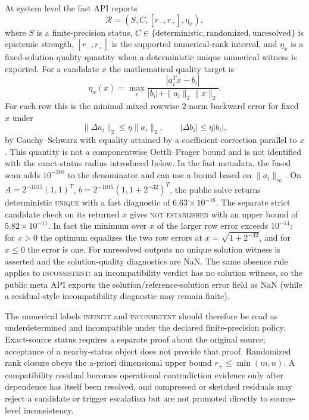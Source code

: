 \documentclass[11pt]{article}
\theoremstyle{definition}
\begin{document}
At system level the fast API reports
\[
 \mathcal R=(S,C,[r_-,r_+],\eta_x),
\]
where $S$ is a finite-precision status, $C\in\{\text{deterministic},\text{randomized},\text{unresolved}\}$ is epistemic strength, $[r_-,r_+]$ is the supported numerical-rank interval, and $\eta_x$ is a fixed-solution quality quantity when a deterministic unique numerical witness is exported. For a candidate $x$ the mathematical quality target is
\[
\eta_x(x)=\max_i
\frac{|a_i^Tx-b_i|}{|b_i|+\|a_i\|_2\|x\|_2}.
\]
For each row this is the minimal mixed rowwise $2$-norm backward error for fixed $x$ under
\[
\|\Delta a_i\|_2\le\eta\|a_i\|_2,
\qquad |\Delta b_i|\le\eta|b_i|,
\]
by Cauchy--Schwarz with equality attained by a coefficient correction parallel to $x$. This quantity is not a componentwise Oettli--Prager bound and is not identified with the exact-status radius introduced below. In the fast metadata, the fused scan adds $10^{-300}$ to the denominator and can use a bound based on $\|a_i\|_\infty$. On $A=2^{-1015}(1,1)^T$, $b=2^{-1015}(1,1+2^{-32})^T$, the public solve returns deterministic \textsc{unique} with a fast diagnostic of $6.63\times10^{-16}$. The separate strict candidate check on its returned $x$ gives \textsc{not established} with an upper bound of $5.82\times10^{-11}$. In fact the minimum over $x$ of the larger row error exceeds $10^{-14}$: for $x>0$ the optimum equalizes the two row errors at $x=\sqrt{1+2^{-32}}$, and for $x\le0$ the error is one. For unresolved outputs no unique solution witness is asserted and the solution-quality diagnostics are NaN.  The same absence rule applies to \textsc{inconsistent}: an incompatibility verdict has no solution witness, so the public meta API exports the solution/reference-solution error field as NaN (while a residual-style incompatibility diagnostic may remain finite).

The numerical labels \textsc{infinite} and \textsc{inconsistent} should therefore be read as underdetermined and incompatible under the declared finite-precision policy. Exact-source status requires a separate proof about the original source; acceptance of a nearby-status object does not provide that proof. Randomized rank closure obeys the a-priori dimensional upper bound $r_+\le\min(m,n)$. A compatibility residual becomes operational contradiction evidence only after dependence has itself been resolved, and compressed or sketched residuals may reject a candidate or trigger escalation but are not promoted directly to source-level inconsistency.
\end{document}

